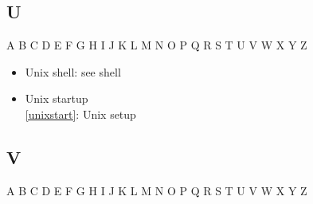 \documentclass[11pt,twoside]{article}
\newcommand{\htmlref}[2]{#1}
\newcommand{\idxint}[2]{\ref{#1}: \htmlref{#2}{#1}}
\newcommand{\idxint}[2]{\htmlref{#2}{#1}}
\begin{document}
\subsection*{\label{index_U}U}

\begin{htmlonly}
\htmlref{A}{index_A}
\htmlref{B}{index_B}
\htmlref{C}{index_C}
\htmlref{D}{index_D}
\htmlref{E}{index_E}
\htmlref{F}{index_F}
\htmlref{G}{index_G}
\htmlref{H}{index_H}
\htmlref{I}{index_I}
\htmlref{J}{index_J}
\htmlref{K}{index_K}
\htmlref{L}{index_L}
\htmlref{M}{index_M}
\htmlref{N}{index_N}
\htmlref{O}{index_O}
\htmlref{P}{index_P}
\htmlref{Q}{index_Q}
\htmlref{R}{index_R}
\htmlref{S}{index_S}
\htmlref{T}{index_T}
U
\htmlref{V}{index_V}
\htmlref{W}{index_W}
\htmlref{X}{index_X}
\htmlref{Y}{index_Y}
Z
\end{htmlonly}

\begin{itemize}
\item Unix shell: see shell
\item Unix startup\\
   \idxint{unixstart}{Unix setup}
\end{itemize}

\subsection*{\label{index_V}V}

\begin{htmlonly}
\htmlref{A}{index_A}
\htmlref{B}{index_B}
\htmlref{C}{index_C}
\htmlref{D}{index_D}
\htmlref{E}{index_E}
\htmlref{F}{index_F}
\htmlref{G}{index_G}
\htmlref{H}{index_H}
\htmlref{I}{index_I}
\htmlref{J}{index_J}
\htmlref{K}{index_K}
\htmlref{L}{index_L}
\htmlref{M}{index_M}
\htmlref{N}{index_N}
\htmlref{O}{index_O}
\htmlref{P}{index_P}
\htmlref{Q}{index_Q}
\htmlref{R}{index_R}
\htmlref{S}{index_S}
\htmlref{T}{index_T}
\htmlref{U}{index_U}
V
\htmlref{W}{index_W}
\htmlref{X}{index_X}
\htmlref{Y}{index_Y}
Z
\end{htmlonly}
\end{document}
